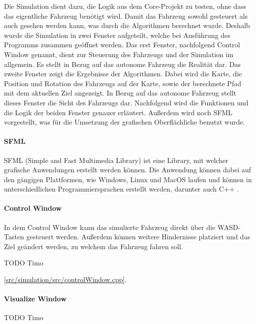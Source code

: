 Die Simulation dient dazu, die Logik aus dem Core-Projekt zu testen, ohne dass das eigentliche Fahrzeug benötigt wird. Damit das Fahrzeug sowohl gesteuert als auch gesehen werden kann, was durch die Algorithmen berechnet wurde. Deshalb wurde die Simulation in zwei Fenster aufgeteilt, welche bei Ausführung des Programms zusammen geöffnet werden. Das erst Fenster, nachfolgend Control Window genannt, dient zur Steuerung des Fahrzeugs und der Simulation im allgemein. Es stellt in Bezug auf das autonome Fahrzeug die Realität dar. Das zweite Fenster zeigt die Ergebnisse der Algorithmen. Dabei wird die Karte, die Position und Rotation des Fahrzeugs auf der Karte, sowie der berechnete Pfad mit dem aktuellen Ziel angezeigt. In Bezug auf das autonome Fahrzeug stellt dieses Fenster die Sicht des Fahrzeugs dar. Nachfolgend wird die Funktionen und die Logik der beiden Fenster genauer erläutert. Außerdem wird noch SFML vorgestellt, was für die Umsetzung der grafischen Oberflächliche benutzt wurde. 

\paragraph{SFML} \mbox{}

SFML (Simple and Fast Multimedia Library) ist eine Library, mit welcher grafische Anwendungen erstellt werden können. Die Anwendung können dabei auf den gängigen Plattformen, wie Windows, Linux und MacOS laufen und können in unterschiedlichen Programmiersprachen erstellt werden, darunter auch C++ \cite{sfml}. 

\paragraph{Control Window} \mbox{}

In dem Control Window kann das simulierte Fahrzeug direkt über die \dq WASD\dq-Tasten gesteuert werden. Außerdem können weitere Hindernisse platziert und das Ziel geändert werden, zu welchem das Fahrzeug fahren soll. 

TODO Timo

[\href{https://github.com/Jundy0/Studienarbeit/blob/main/src/simulation/src/controlWindow.cpp}{src/simulation/src/controlWindow.cpp}]. 

\paragraph{Visualize Window} \mbox{}

TODO Timo

